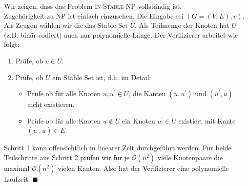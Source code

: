 \documentclass[11pt,a4paper]{article}
\newcommand{\qedb}{\hfill\(\blacksquare\)}
\begin{document}
Wir zeigen, dass das Problem \textsc{In-Stable} \textsf{NP}-vollständig ist.\\
Zugehörigkeit zu \textsf{NP} ist einfach einzusehen. Die Eingabe sei \( (G = (V, E), v) \). Als Zeugen wählen wir die das Stable Set \( U \). Als Teilmenge der Knoten hat \( U \) ({z.B.} binär codiert) auch nur polynomielle Länge. Der Verifizierer arbeitet wie folgt:
\begin{enumerate}
	\item Prüfe, ob \( v \in U \).
	\item Prüfe, ob \( U \) ein Stable Set ist, d.h. im Detail:
		\begin{itemize}
			\item Prüfe ob für alle Knoten \( u, u^\prime \in U \), die Kanten \( (u, u^\prime) \) und \( (u^\prime, u) \) nicht existieren.
			\item Prüfe ob für alle Knoten \( u \notin U \) ein Knoten \( u^\prime \in U \) existiert mit Kante \( (u^\prime, u) \in E \).
		\end{itemize}
\end{enumerate}
Schritt 1 kann offensichtlich in linearer Zeit durchgeführt werden. Für beide Teilschritte aus Schritt 2 prüfen wir für je \( \mathcal{O}(n^2) \) viele Knotenpaare die maximal \( \mathcal{O}(n^2) \) vielen Kanten. Also hat der Verifizierer eine polynomielle Laufzeit. \qedb\\[2em]
\end{document}
